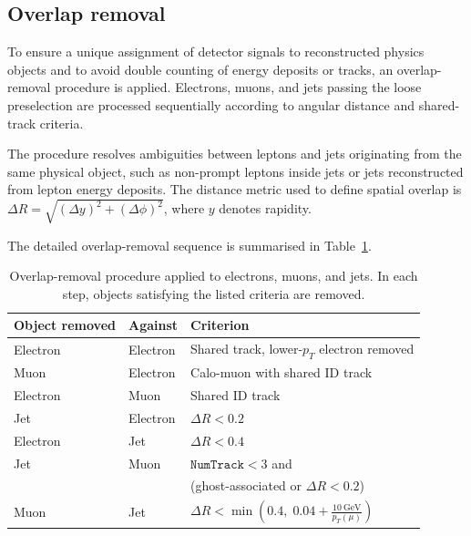 \subsection{Overlap removal}
\label{subsec:overlap-removal}

To ensure a unique assignment of detector signals to reconstructed
physics objects and to avoid double counting of energy deposits
or tracks, an overlap-removal procedure is applied.
Electrons, muons, and jets passing the loose preselection
are processed sequentially according to angular distance
and shared-track criteria.

The procedure resolves ambiguities between leptons and jets
originating from the same physical object, such as
non-prompt leptons inside jets or jets reconstructed from
lepton energy deposits.
The distance metric used to define spatial overlap is
$\Delta R = \sqrt{(\Delta y)^2 + (\Delta\phi)^2}$,
where $y$ denotes rapidity.

The detailed overlap-removal sequence is summarised in
Table~\ref{tab:overlap_removal}.

\begin{table}[ht]
\caption{Overlap-removal procedure applied to electrons, muons, and jets.
In each step, objects satisfying the listed criteria are removed.}
\label{tab:overlap_removal}
\centering
\begin{tabular}{lll}
\toprule
Object removed & Against & Criterion \\
\midrule
Electron & Electron & Shared track, lower-$p_T$ electron removed \\

Muon     & Electron & Calo-muon with shared ID track \\

Electron & Muon     & Shared ID track \\

Jet      & Electron & $\Delta R < 0.2$ \\

Electron & Jet      & $\Delta R < 0.4$ \\

Jet      & Muon     & $\texttt{NumTrack} < 3$ and \\
         &          & (ghost-associated or $\Delta R < 0.2$) \\

Muon     & Jet      & $\Delta R < \min\!\left(0.4,\; 0.04 + \frac{10~\mathrm{GeV}}{p_T(\mu)}\right)$ \\

\bottomrule
\end{tabular}
\end{table}

